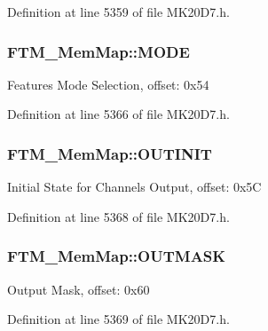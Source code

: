 Definition at line 5359 of file M\+K20\+D7.\+h.

\subsubsection[{\texorpdfstring{M\+O\+DE}{MODE}}]{ F\+T\+M\+\_\+\+Mem\+Map\+::\+M\+O\+DE}\hypertarget{struct_f_t_m___mem_map_a1cabc42a484f2abbd67af1345b90fcc4}{}\label{struct_f_t_m___mem_map_a1cabc42a484f2abbd67af1345b90fcc4}
Features Mode Selection, offset\+: 0x54 

Definition at line 5366 of file M\+K20\+D7.\+h.

\subsubsection[{\texorpdfstring{O\+U\+T\+I\+N\+IT}{OUTINIT}}]{ F\+T\+M\+\_\+\+Mem\+Map\+::\+O\+U\+T\+I\+N\+IT}\hypertarget{struct_f_t_m___mem_map_aacdd40604d98720d58618c5e9f0fb0fd}{}\label{struct_f_t_m___mem_map_aacdd40604d98720d58618c5e9f0fb0fd}
Initial State for Channels Output, offset\+: 0x5C 

Definition at line 5368 of file M\+K20\+D7.\+h.

\subsubsection[{\texorpdfstring{O\+U\+T\+M\+A\+SK}{OUTMASK}}]{ F\+T\+M\+\_\+\+Mem\+Map\+::\+O\+U\+T\+M\+A\+SK}\hypertarget{struct_f_t_m___mem_map_a16b10477073d1a3822d96ea9f65752fe}{}\label{struct_f_t_m___mem_map_a16b10477073d1a3822d96ea9f65752fe}
Output Mask, offset\+: 0x60 

Definition at line 5369 of file M\+K20\+D7.\+h.

